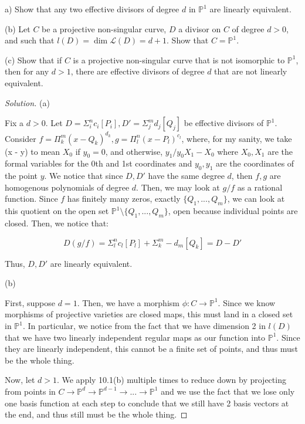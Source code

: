 \documentclass[10pt]{article}
\newenvironment{problem}[2][Problem]{\begin{trivlist}
\item[\hskip \labelsep {\bfseries #1}\hskip \labelsep {\bfseries #2.}]}{\end{trivlist}}
\begin{document}
\begin{problem}{10.2}

(a) Show that any two effective divisors of degree $d$ in $\mathbb{P}^1$ are linearly equivalent.

(b) Let $C$ be a projective non-singular curve, $D$ a divisor on $C$ of degree $d > 0$, and such that $l(D) = \dim \mathcal{L}(D) = d + 1$. Show that $C = \mathbb{P}^1$. 

(c) Show that if $C$ is a projective non-singular curve that is not isomorphic to $\mathbb{P}^1$, then for any $d > 1$, there are effective divisors of degree $d$ that are not linearly equivalent.

\end{problem}

\begin{proof}[Solution]

(a)

Fix a $d > 0$. Let $D = \Sigma_i^n c_i [P_i], D' = \Sigma_j^m d_j [Q_j]$ be effective divisors of $\mathbb{P}^1$. Consider $f = \Pi_k^{m} (x-Q_k)^{d_k}, g = \Pi_l^n (x-P_l)^{c_l}$, where, for my sanity, we take (x - y) to mean $X_0$ if $y_0 = 0$, and otherwise, $y_1/y_0X_1 - X_0$ where $X_0,X_1$ are the formal variables for the 0th and 1st coordinates and $y_0,y_1$ are the coordinates of the point $y$. We notice that since $D, D'$ have the same degree $d$, then $f,g$ are homogenous polynomials of degree $d$. Then, we may look at $g/f$ as a rational function. Since $f$ has finitely many zeros, exactly $\{ Q_1,...,Q_m \}$, we can look at this quotient on the open set $\mathbb{P}^1 \setminus \{ Q_1,...,Q_m \}$, open because individual points are closed. Then, we notice that:

$$D(g/f) = \Sigma_l^n c_l [P_l ] + \Sigma_k^m -d_m [Q_k] = D - D'$$

Thus, $D, D'$ are linearly equivalent.

(b)

First, suppose $d = 1$. Then, we have a morphism $\phi: C \to \mathbb{P}^1$. Since we know morphisms of projective varieties are closed maps, this must land in a closed set in $\mathbb{P}^1$. In particular, we notice from the fact that we have dimension 2 in $l(D)$ that we have two linearly independent regular maps as our function into $\mathbb{P}^1$. Since they are linearly independent, this cannot be a finite set of points, and thus must be the whole thing.

Now, let $d > 1$. We apply 10.1(b) multiple times to reduce down by projecting from points in $C \to \mathbb{P}^{d} \to \mathbb{P}^{d-1} \to ... \to \mathbb{P}^{1}$ and we use the fact that we lose only one basis function at each step to conclude that we still have 2 basis vectors at the end, and thus still must be the whole thing.


\end{proof}
\end{document}
